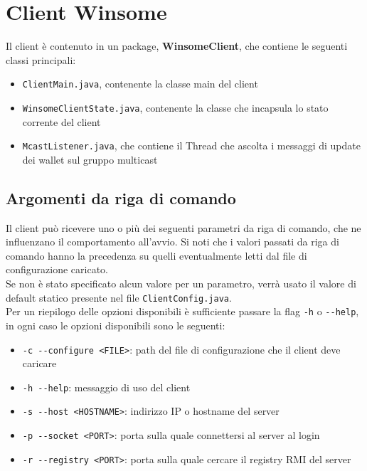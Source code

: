 \section{Client Winsome}
Il client è contenuto in un package, \textbf{WinsomeClient}, che contiene le seguenti classi principali:
\begin{itemize}
	\item \verb|ClientMain.java|, contenente la classe main del client
	\item \verb|WinsomeClientState.java|, contenente la classe che incapsula lo stato corrente del client
	\item \verb|McastListener.java|, che contiene il Thread che ascolta i messaggi di update dei wallet sul gruppo multicast
\end{itemize}

\subsection{Argomenti da riga di comando}
Il client può ricevere uno o più dei seguenti parametri da riga di comando, che ne influenzano il comportamento all'avvio.
Si noti che i valori passati da riga di comando hanno la precedenza su quelli eventualmente letti dal file di configurazione caricato.\\
Se non è stato specificato alcun valore per un parametro, verrà usato il valore di default statico presente nel file \verb|ClientConfig.java|.\\
Per un riepilogo delle opzioni disponibili è sufficiente passare la flag \verb|-h| o \verb|--help|, in ogni caso le opzioni
disponibili sono le seguenti:

\begin{itemize}
	\item \verb|-c --configure <FILE>|: path del file di configurazione che il client deve caricare
	\item \verb|-h --help|: messaggio di uso del client
	\item \verb|-s --host <HOSTNAME>|: indirizzo IP o hostname del server
	\item \verb|-p --socket <PORT>|: porta sulla quale connettersi al server al login
	\item \verb|-r --registry <PORT>|: porta sulla quale cercare il registry RMI del server
\end{itemize}

